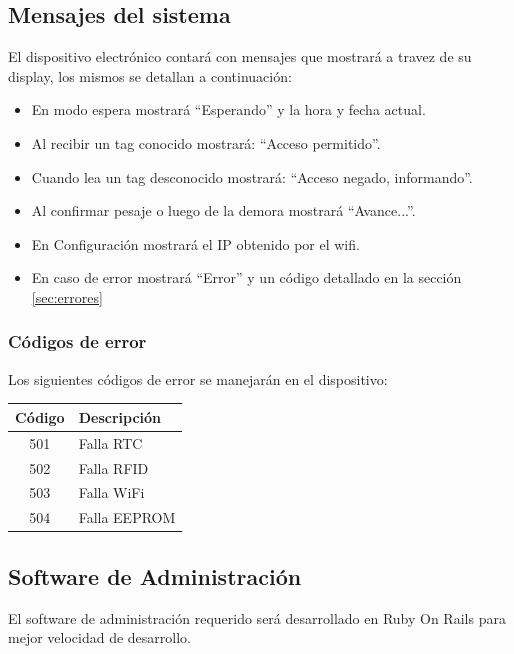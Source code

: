 \subsection{Mensajes del sistema}
El dispositivo electrónico contará con mensajes que mostrará a travez de su display, los mismos se detallan a continuación:
\begin{itemize}
	\item En modo espera mostrará ``Esperando'' y la hora y fecha actual.
	\item Al recibir un tag conocido mostrará: ``Acceso permitido''.
	\item Cuando lea un tag desconocido mostrará: ``Acceso negado, informando''.
	\item Al confirmar pesaje o luego de la demora mostrará ``Avance...''.
	\item En Configuración mostrará el IP obtenido por el wifi. 
	\item En caso de error mostrará ``Error'' y un código detallado en la sección \ref{sec:errores}
\end{itemize}

\subsubsection{Códigos de error}
Los siguientes códigos de error se manejarán en el dispositivo:\label{sec:errores}\\
\begin{center}
	\begin{tabular}{|c|l|}
		\hline
		Código & Descripción \\
		\hline
		501 & Falla RTC\\
		502 & Falla RFID\\
		503 & Falla WiFi\\
		504 & Falla EEPROM\\
		\hline
	\end{tabular}
\end{center}
\subsection{Software de Administración}

El software de administraci\'on requerido ser\'a desarrollado en Ruby On Rails para mejor velocidad de desarrollo.

